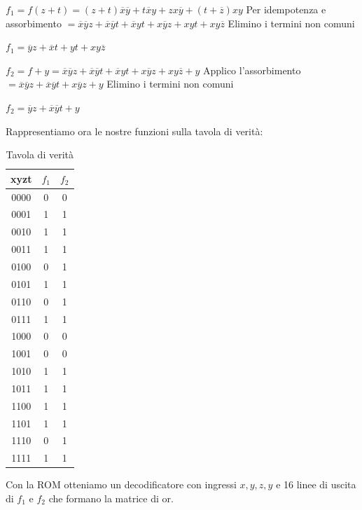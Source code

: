 \begin{exercise}
\begin{enumerate}
        $f_1=f(z+t)=(z+t)\overline{x}\overline{y}+t\overline{x}y+zx\overline{y}+(t+\overline{z})xy$ Per idempotenza e assorbimento $= \overline{x}\overline{y}z+\overline{x}\overline{y}t+\overline{x}yt+x\overline{y}z+xyt+xy\overline{z}$ Elimino i termini non comuni
        \begin{center}
            $f_1=\overline{y}z+\overline{x}t+yt+xy\overline{z}$    
        \end{center}
        
        $f_2=f+y=\overline{x}\overline{y}z+\overline{x}\overline{y}t+\overline{x}yt+x\overline{y}z+xy\overline{z}+y$ Applico l'assorbimento $= \overline{x}\overline{y}z+\overline{x}\overline{y}t+x\overline{y}z+y$ Elimino i termini non comuni
        \begin{center}
            $f_2=\overline{y}z+\overline{x}\overline{y}t+y$
        \end{center}
    \end{enumerate}
    
    Rappresentiamo ora le nostre funzioni sulla tavola di verità:
    \begin{table}[H]
    \centering
    \begin{tabular}{c|c|c}
         xyzt & $f_1$&$f_2$\\\hline
         0000 & 0&0\\
         0001 & 1&1\\
         0010 & 1&1\\
         0011 & 1&1\\\hline
         0100 & 0&1\\
         0101 & 1&1\\
         0110 & 0&1\\
         0111 & 1&1\\\hline
         1000 & 0&0\\
         1001 & 0&0\\
         1010 & 1&1\\
         1011 & 1&1\\\hline
         1100 & 1&1\\
         1101 & 1&1\\
         1110 & 0&1\\
         1111 & 1&1\\
    \end{tabular}
    \caption{Tavola di verità}
\end{table}

    Con la ROM otteniamo un decodificatore con ingressi $x,y,z,y$ e 16 linee di uscita di $f_1$ e $f_2$ che formano la matrice di or.
    

\end{exercise}
